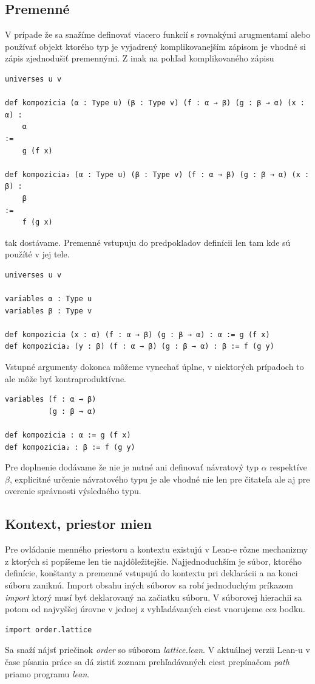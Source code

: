 \documentclass[a4paper,10pt,oneside]{report}%
\begin{document}
\subsection{Premenné}
    V prípade že sa snažíme definovať viacero funkcií s rovnakými arugmentami alebo
používať objekt ktorého typ je vyjadrený komplikovanejším zápisom je vhodné si
zápis zjednodušiť premennými.
    Z inak na pohľad komplikovaného zápisu
\begin{lstlisting}
universes u v

def kompozicia (α : Type u) (β : Type v) (f : α → β) (g : β → α) (x : α) :
    α
:=
    g (f x)

def kompozicia₂ (α : Type u) (β : Type v) (f : α → β) (g : β → α) (x : β) :
    β
:=
    f (g x)
\end{lstlisting}
    tak dostávame.
    Premenné vstupuju do predpokladov definícii len tam kde sú použíté v jej tele.
\begin{lstlisting}
universes u v

variables α : Type u
variables β : Type v

def kompozicia (x : α) (f : α → β) (g : β → α) : α := g (f x)
def kompozicia₂ (y : β) (f : α → β) (g : β → α) : β := f (g y)
\end{lstlisting}
    Vstupné argumenty dokonca môžeme vynechať úplne, v niektorých prípadoch to ale
môže byť kontraproduktívne.
\begin{lstlisting}
variables (f : α → β)
          (g : β → α)

def kompozicia : α := g (f x)
def kompozicia₂ : β := f (g y)
\end{lstlisting}
Pre doplnenie dodávame že nie je nutné ani definovať návratový typ $\alpha$
    respektíve $\beta$, explicitné určenie návratového typu je ale vhodné nie len
    pre čitateľa ale aj pre overenie správnosti výsledného typu.
\subsection{Kontext, priestor mien}
    Pre ovládanie menného priestoru a kontextu existujú v Lean-e rôzne mechanizmy
z ktorých si popíšeme len tie najdôležitejšie.
    Najjednoduchším je súbor, ktorého definície, konštanty a premenné vstupujú do
kontextu pri deklarácii a na konci súboru zaniknú.
    Import obsahu iných súborov sa robí jednoduchým príkazom \emph{import} ktorý
musí byť deklarovaný na začiatku súboru. V súborovej hierachii sa potom od najvyššej
úrovne v jednej z vyhľadávaných ciest vnorujeme cez bodku.
\begin{lstlisting}
import order.lattice
\end{lstlisting}
    Sa snaží nájsť priečinok \emph{order} so súborom \emph{lattice.lean}.
    V aktuálnej verzii Lean-u v čase písania práce sa dá zistiť zoznam prehľadávaných
ciest prepínačom \emph{path} priamo programu \emph{lean}.
\end{document}
